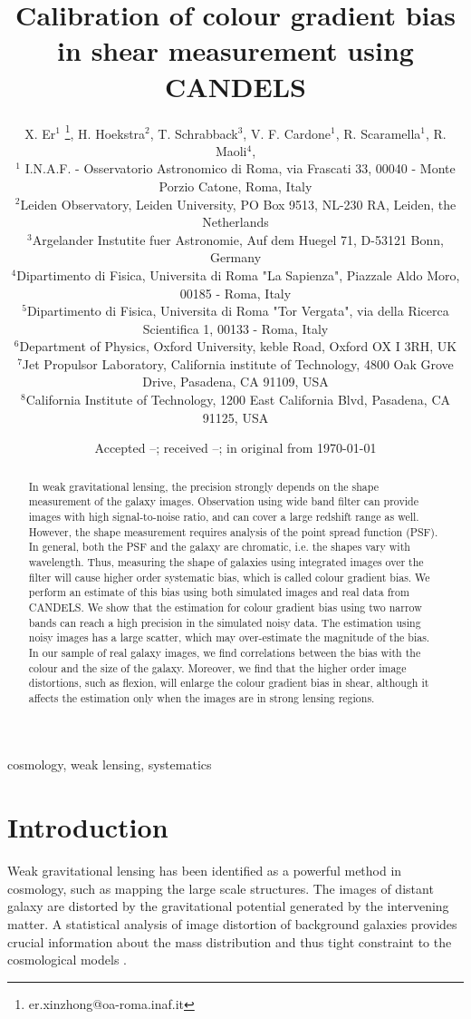 \documentclass[useAMS,usenatbib]{mn2e}
\title[Colour gradient bias]
{Calibration of colour gradient bias in shear measurement using CANDELS}
\author[Xer et al.]%
{
X. Er$^1$ \thanks{er.xinzhong@oa-roma.inaf.it},
H. Hoekstra$^2$, T. Schrabback$^3$, V. F. Cardone$^1$, R. Scaramella$^1$, R. Maoli$^4$,
\newauthor{M. Vicinanza$^{1,4,5}$, L. Miller$^{6}$, J. Rhodes$^{7,8}$}
\\
$^1$ I.N.A.F. - Osservatorio Astronomico di Roma, via Frascati 33, 00040 - Monte Porzio Catone, Roma, Italy\\
$^2$Leiden Observatory, Leiden University, PO Box 9513, NL-230 RA, Leiden, the Netherlands \\
$^3$Argelander Instutite fuer Astronomie, Auf dem Huegel 71, D-53121 Bonn, Germany\\
$^4$Dipartimento di Fisica, Universita di Roma "La Sapienza", Piazzale Aldo Moro, 00185 - Roma, Italy\\
$^5$Dipartimento di Fisica, Universita di Roma "Tor Vergata", via della Ricerca Scientifica 1, 00133 - Roma, Italy\\
$^6$Department of Physics, Oxford University, keble Road, Oxford OX I 3RH, UK\\
$^7$Jet Propulsor Laboratory, California institute of Technology, 4800 Oak Grove Drive, Pasadena, CA 91109, USA\\
$^8$California Institute of Technology, 1200 East California Blvd, Pasadena, CA 91125, USA
}
\date{Accepted --;  received --;  in original from \today}
\begin{document}
\maketitle

\begin{abstract}
  In weak gravitational lensing, the precision strongly depends on
  the shape measurement of the galaxy images. Observation using wide
  band filter can provide images with high signal-to-noise ratio, and
  can cover a large redshift range as well. However, the shape
  measurement requires analysis of the point spread function
  (PSF). In general, both the PSF and the galaxy are chromatic,
  i.e. the shapes vary with wavelength. Thus, measuring the shape of
  galaxies using integrated images over the filter will cause higher
  order systematic bias, which is called colour gradient bias.
  We perform an estimate of this bias using both simulated
  images and real data from CANDELS. We show that the estimation for
  colour gradient bias using two narrow bands can reach a high precision
  in the simulated noisy data. The estimation using noisy images has a
  large scatter, which may over-estimate the magnitude of the bias.
  In our sample of real galaxy images, we find correlations between
  the bias with the colour and the size of the galaxy. Moreover, we
  find that the higher order image distortions, such as flexion, will
  enlarge the colour gradient bias in shear, although it affects
  the estimation only when the images are in strong lensing regions.
\end{abstract}
\begin{keywords} cosmology, weak lensing, systematics
\end{keywords}


\section{Introduction}

Weak gravitational lensing has been identified as a powerful method in
cosmology, such as mapping the large scale structures. The images of
distant galaxy are distorted by the gravitational potential generated
by the intervening matter. A statistical analysis of image distortion
of background galaxies provides crucial information about the mass
distribution and thus tight constraint to the cosmological models
\citep[e.g.][]{2001PhR...340..291B,2008ARNPS..58...99H}.
\end{document}
